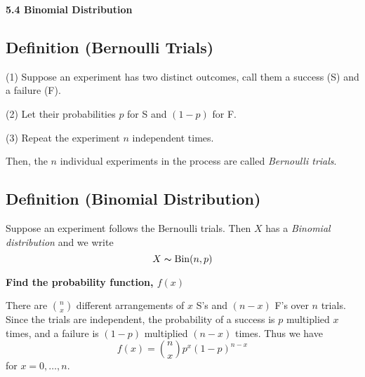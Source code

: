 \textbf{5.4 Binomial Distribution}
\begin{defbox}
    \subsection{Definition (Bernoulli Trials)}
    (1) Suppose an experiment has two distinct outcomes, call them a success (S)
    and a failure (F).
    
    (2) Let their probabilities $ p $ for S and $ (1-p) $ for F.
    
    (3) Repeat the experiment $ n $ independent times.
    
    Then, the $ n $ individual experiments in the process are called
    \emph{Bernoulli trials}.
\end{defbox}
\begin{defbox}
    \subsection{Definition (Binomial Distribution)}
    Suppose an experiment follows the Bernoulli trials. Then $ X $ has a
    \emph{Binomial distribution} and we write
    \[ X \thicksim \operatorname{Bin}(n,p) \]
\end{defbox}

\textbf{Find the probability function, $ f(x)$}

There are $ \binom{n}{x} $ different arrangements of $ x $ S's and $ (n-x) $ F's
over $ n $ trials. Since the trials are independent, the probability of a success
is $ p $ multiplied $ x $ times, and a failure is $ (1-p) $ multiplied $ (n-x) $ times.
Thus we have
\[ f(x)=\binom{n}{x}p^x(1-p)^{n-x} \]
for $ x=0,\ldots ,n $.
